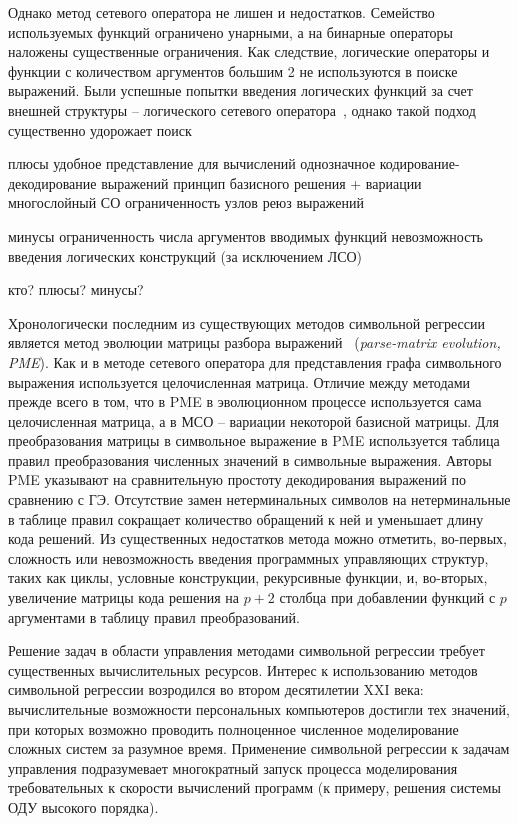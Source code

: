Однако метод сетевого оператора не лишен и недостатков.
Семейство используемых функций ограничено унарными, а на бинарные операторы наложены существенные ограничения.
Как следствие, логические операторы и функции с количеством аргументов большим 2 не используются в поиске выражений.
Были успешные попытки введения логических функций за счет внешней структуры -- логического сетевого оператора~, однако такой подход существенно удорожает поиск

плюсы
удобное представление для вычислений
однозначное кодирование-декодирование выражений
принцип базисного решения + вариации
многослойный СО
ограниченность узлов
реюз выражений

минусы
ограниченность числа аргументов вводимых функций
невозможность введения логических конструкций (за исключением ЛСО)

кто?
плюсы?
минусы?

Хронологически последним из существующих методов символьной регрессии является метод эволюции матрицы разбора выражений~\cite{Luo2012} (\textit{parse-matrix evolution, PME}).
Как и в методе сетевого оператора для представления графа символьного выражения используется целочисленная матрица.
Отличие между методами прежде всего в том, что в PME в эволюционном процессе используется сама целочисленная матрица, а в МСО -- вариации некоторой базисной матрицы.
Для преобразования матрицы в символьное выражение в PME используется таблица правил преобразования численных значений в символьные выражения.
Авторы PME указывают на сравнительную простоту декодирования выражений по сравнению с ГЭ.
Отсутствие замен нетерминальных символов на нетерминальные в таблице правил сокращает количество обращений к ней и уменьшает длину кода решений.
Из существенных недостатков метода можно отметить, во-первых, сложность или невозможность введения программных управляющих структур, таких как циклы, условные конструкции, рекурсивные функции, и, во-вторых, увеличение матрицы кода решения на $p+2$ столбца при добавлении функций с $p$ аргументами в таблицу правил преобразований.

Решение задач в области управления методами символьной регрессии требует существенных вычислительных ресурсов.
Интерес к использованию методов символьной регрессии возродился во втором десятилетии XXI века: вычислительные возможности персональных компьютеров достигли тех значений, при которых возможно проводить полноценное численное моделирование сложных систем за разумное время.
Применение символьной регрессии к задачам управления подразумевает многократный запуск процесса моделирования требовательных к скорости вычислений программ (к примеру, решения системы ОДУ высокого порядка).


